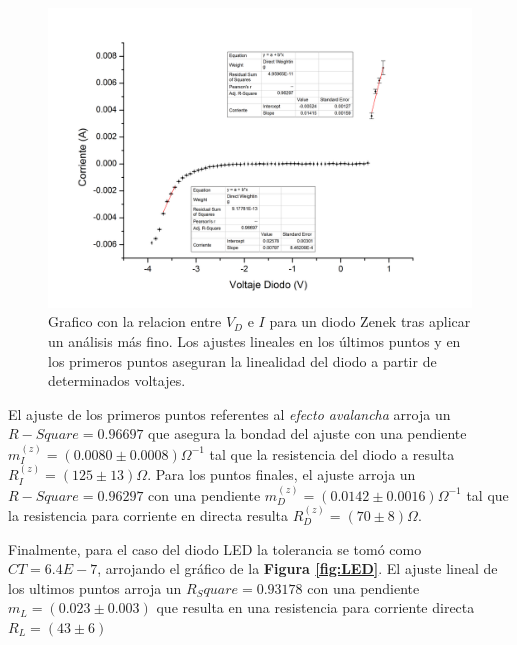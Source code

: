 \documentclass[11pt,a4paper]{article}
\begin{document}
\begin{figure}[H]
\centering
\includegraphics[scale=0.5]{zenek}
   \caption{Grafico con la relacion entre $V_D$ e $I$ para un diodo Zenek tras aplicar un análisis más fino. Los ajustes lineales en los últimos puntos y en los primeros puntos aseguran la linealidad del diodo a partir de determinados voltajes.}
   \label{fig:zenek}
\end{figure}

El ajuste de los primeros puntos referentes al \textit{efecto avalancha} arroja un $R-Square = 0.96697$ que asegura la bondad del ajuste con una pendiente $m_I^{(z)} = (0.0080 \pm 0.0008)\Omega^{-1}$ tal que la resistencia del diodo a resulta $R_I^{(z)} = (125 \pm 13)\Omega$. Para los puntos finales, el ajuste arroja un $R-Square = 0.96297$ con una pendiente $m_D^{(z)} = (0.0142 \pm 0.0016)\Omega^{-1}$ tal que la resistencia para corriente en directa resulta $R_D^{(z)} = (70 \pm 8)\Omega$.

Finalmente, para el caso del diodo LED la tolerancia se tomó como $CT = 6.4E-7$, arrojando el gráfico de la \textbf{Figura \ref{fig:LED}}. El ajuste lineal de los ultimos puntos arroja un $R_Square = 0.93178$ con una pendiente $m_L = (0.023 \pm 0.003)$ que resulta en una resistencia para corriente directa $R_L = (43 \pm 6)$
\end{document}
